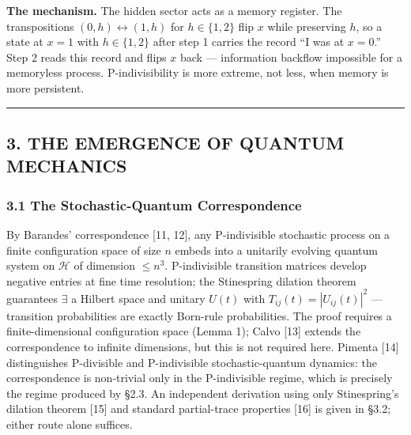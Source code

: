 \documentclass[
]{article}
\begin{document}
\textbf{The mechanism.} The hidden sector acts as a memory register. The
transpositions \((0,h) \leftrightarrow (1,h)\) for \(h \in \{1, 2\}\)
flip \(x\) while preserving \(h\), so a state at \(x = 1\) with
\(h \in \{1, 2\}\) after step 1 carries the record ``I was at
\(x = 0\).'' Step 2 reads this record and flips \(x\) back ---
information backflow impossible for a memoryless process.
P-indivisibility is more extreme, not less, when memory is more
persistent.

\begin{center}\rule{0.5\linewidth}{0.5pt}\end{center}

\hypertarget{the-emergence-of-quantum-mechanics}{%
\subsection{3. THE EMERGENCE OF QUANTUM
MECHANICS}\label{the-emergence-of-quantum-mechanics}}

\hypertarget{the-stochastic-quantum-correspondence}{%
\subsubsection{3.1 The Stochastic-Quantum
Correspondence}\label{the-stochastic-quantum-correspondence}}

By Barandes' correspondence {[}11, 12{]}, any P-indivisible stochastic
process on a finite configuration space of size \(n\) embeds into a
unitarily evolving quantum system on \(\mathcal{H}\) of dimension
\(\leq n^3\). P-indivisible transition matrices develop negative entries
at fine time resolution; the Stinespring dilation theorem guarantees
\(\exists\) a Hilbert space and unitary \(U(t)\) with
\(T_{ij}(t) = |U_{ij}(t)|^2\) --- transition probabilities are exactly
Born-rule probabilities. The proof requires a finite-dimensional
configuration space (Lemma 1); Calvo {[}13{]} extends the correspondence
to infinite dimensions, but this is not required here. Pimenta {[}14{]}
distinguishes P-divisible and P-indivisible stochastic-quantum dynamics:
the correspondence is non-trivial only in the P-indivisible regime,
which is precisely the regime produced by §2.3. An independent
derivation using only Stinespring's dilation theorem {[}15{]} and
standard partial-trace properties {[}16{]} is given in §3.2; either
route alone suffices.
\end{document}
